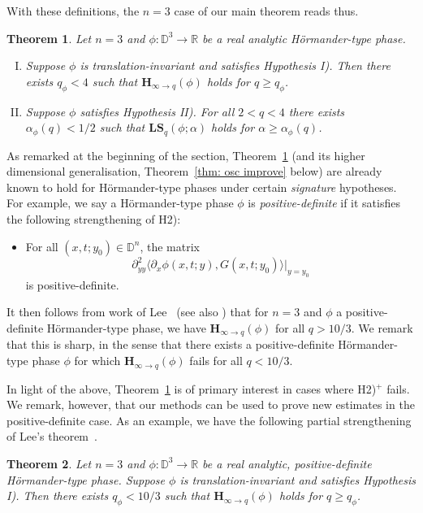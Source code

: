 \documentclass[reqno]{amsart}
\numberwithin{equation}{section}
\newcommand{\D}{\mathbb{D}}
\newcommand{\R}{\mathbb{R}}
\newcommand{\bH}{\mathbf{H}}
\newcommand{\bLS}{\mathbf{LS}}
\theoremstyle{plain}
\newtheorem{theorem}{Theorem}[section]
\theoremstyle{definition}
\begin{document}
With these definitions, the $n = 3$ case of our main theorem reads thus. 

\begin{theorem}\label{thm: n=3 osc improve}  Let $n =3$ and $\phi \colon \D^3 \to \R$ be a real analytic H\"ormander-type phase. 
\begin{enumerate}[I)]
    \item Suppose $\phi$ is translation-invariant and satisfies Hypothesis I). Then there exists $q_{\phi} < 4$ such that $\bH_{\infty \to q}(\phi)$ holds for $q \geq q_{\phi}$.
    \item Suppose $\phi$ satisfies Hypothesis II). For all $2 < q < 4$ there exists $\alpha_{\phi}(q) < 1/2$ such that $\bLS_q(\phi; \alpha)$ holds for $\alpha \geq \alpha_{\phi}(q)$. 
\end{enumerate}
\end{theorem}

As remarked at the beginning of the section, Theorem~\ref{thm: n=3 osc improve} (and its higher dimensional generalisation, Theorem~\ref{thm: osc improve} below) are already known to hold for H\"ormander-type phases under certain \textit{signature} hypotheses. For example, we say a H\"ormander-type phase $\phi$ is \textit{positive-definite} if it satisfies the following strengthening of H2):
\begin{itemize}
\item[H2$^+$)] For all $(x, t; y_0) \in \D^n$, the matrix 
\begin{equation*}
\partial^2_{yy} \langle \partial_x\phi(x, t; y),G(x, t;y_0)\rangle|_{y = y_0}
\end{equation*}
is positive-definite.
\end{itemize}
It then follows from work of Lee~\cite{Lee2006} (see also \cite{BG2011, GHI2019, HI2022}) that for $n = 3$ and $\phi$ a positive-definite H\"ormander-type phase, we have $\bH_{\infty \to q}(\phi)$ for all $q > 10/3$. We remark that this is sharp, in the sense that there exists a positive-definite H\"ormander-type phase $\phi$ for which $\bH_{\infty \to q}(\phi)$ fails for all $q < 10/3$.

In light of the above, Theorem~\ref{thm: n=3 osc improve} is of primary interest in cases where H2)$^+$ fails. We remark, however, that our methods can be used to prove new estimates in the positive-definite case. As an example, we have the following partial strengthening of Lee's theorem~\cite{Lee2006}.

\begin{theorem}\label{thm: pos-def}  Let $n = 3$ and $\phi \colon \D^3 \to \R$ be a real analytic, positive-definite H\"ormander-type phase. Suppose $\phi$ is translation-invariant and satisfies Hypothesis I). Then there exists $q_{\phi} < 10/3$ such that $\bH_{\infty \to q}(\phi)$ holds for $q \geq q_{\phi}$.
\end{theorem}
\end{document}
